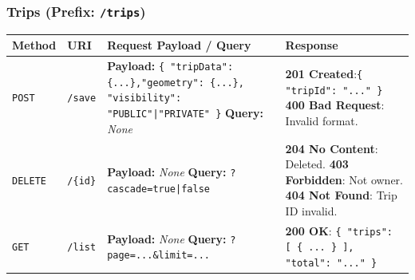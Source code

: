 \subsubsection*{Trips (Prefix: \texttt{/trips})}
\begin{table}[H]
    \sf
    \small
    \centering
    \renewcommand{\arraystretch}{1.5}
    \begin{tabularx}{\textwidth}{|l|p{2.5cm}|p{4cm}|X|}
    \hline
    \rowcolor{lightgray}\textbf{Method} & \textbf{URI} & \textbf{Request Payload / Query} & \textbf{Response} \\ \hline
    
    \texttt{POST} & \texttt{/save} & \textbf{Payload:} \newline \texttt{\{ "tripData": \{...\},\newline "geometry": \{...\}, \newline "visibility": \newline "PUBLIC"|"PRIVATE" \}} \newline \textbf{Query:} \newline \textit{None} & 
    \textbf{201 Created}:\newline \texttt{\{ "tripId": "..." \}} \newline
    \textbf{400 Bad Request}: Invalid format. \\ \hline
    
    \texttt{DELETE} & \texttt{/\{id\}} &
    \textbf{Payload:} \newline \textit{None} \newline \textbf{Query:} \newline
    \texttt{?cascade=true|false} & 
    \textbf{204 No Content}: Deleted. \newline
    \textbf{403 Forbidden}: Not owner. \newline
    \textbf{404 Not Found}: Trip ID invalid. \\ \hline
    
    \texttt{GET} & \texttt{/list} &
    \textbf{Payload:} \newline \textit{None} \newline \textbf{Query:} \newline
    \texttt{?page=...\&limit=...} & 
    \textbf{200 OK}: \newline \texttt{\{ "trips": [ \{ ... \} ], \newline "total": "..." \}} \\ \hline
    

\end{tabularx}
\end{table}
